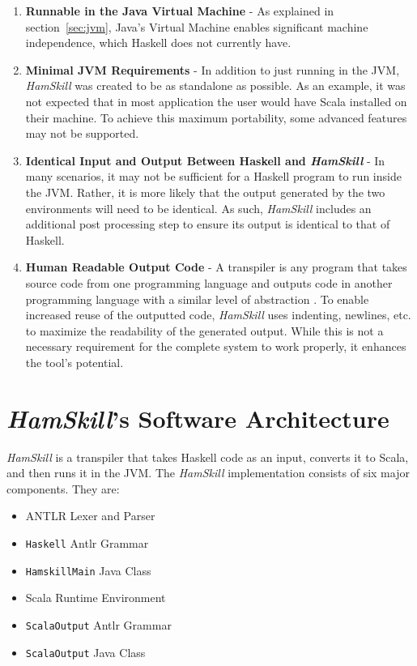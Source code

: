 \documentclass{report}
\begin{document}
\begin{enumerate}

\item \textbf{Runnable in the Java Virtual Machine} - As explained in section~\ref{sec:jvm}, Java's Virtual Machine enables significant machine independence, which Haskell does not currently have.

\item \textbf{Minimal JVM Requirements} - In addition to just running in the JVM, \textit{HamSkill} was created to be as standalone as possible.  As an example, it was not expected that in most application the user would have Scala installed on their machine.  To achieve this maximum portability, some advanced features may not be supported.

\item \textbf{Identical Input and Output Between Haskell and \emph{HamSkill}} - In many scenarios, it may not be sufficient for a Haskell program to run inside the JVM.  Rather, it is more likely that the output generated by the two environments will need to be identical.  As such, \emph{HamSkill} includes an additional post processing step to ensure its output is identical to that of Haskell.

\item \textbf{Human Readable Output Code} - A transpiler is any program that takes source code from one programming language and outputs code in another programming language with a similar level of abstraction \cite{jansen_2015}.  To enable increased reuse of the outputted code, \textit{HamSkill} uses indenting, newlines, etc. to maximize the readability of the generated output.  While this is not a necessary requirement for the complete system to work properly, it enhances the tool's potential.

\end{enumerate}

\section{\textit{HamSkill}'s Software Architecture}\label{sec:hamskillSoftwareArchitecture}

\emph{HamSkill} is a transpiler that takes Haskell code as an input, converts it to Scala, and then runs it in the JVM.  The \emph{HamSkill} implementation consists of six major components.  They are:

\begin{itemize}
   \item ANTLR Lexer and Parser
   \item \texttt{Haskell} Antlr Grammar
   \item \texttt{HamskillMain} Java Class
   \item Scala Runtime Environment
   \item \texttt{ScalaOutput} Antlr Grammar
   \item \texttt{ScalaOutput} Java Class
\end{itemize}
\end{document}
